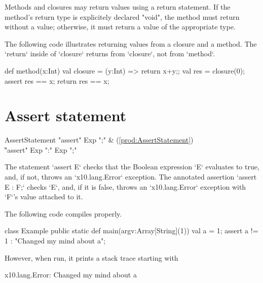 Methods and closures may return values using a return statement.
If the method's return type is explicitely declared \xcd"void",
the method must return without a value; otherwise, it must return
a value of the appropriate type.

\begin{ex}
The following code illustrates returning values from a closure and a method.
The \xcd`return` inside of \xcd`closure` returns from \xcd`closure`, not from
\xcd`method`.  
\begin{xten}
def method(x:Int) {
  val closure = (y:Int) => {return x+y;}; 
  val res = closure(0);
  assert res == x;
  return res == x;
}
\end{xten}


\end{ex}


\section{Assert statement} 

\begin{bbgrammar}
     AssertStatement \: \xcd"assert" Exp \xcd";" & (\ref{prod:AssertStatement}) \\
                    \| \xcd"assert" Exp  \xcd":" Exp  \xcd";" \\
\end{bbgrammar}

The statement \xcd`assert E` checks that the Boolean expression \xcd`E`
evaluates to true, and, if not, throws an \xcd`x10.lang.Error`  exception.  
The annotated assertion \xcd`assert E : F;` checks \xcd`E`, and, if it is
false, throws an \xcd`x10.lang.Error` exception with \xcd`F`'s value attached
to it. 

\begin{ex}
The following code compiles properly.  
% 
\begin{xten}
class Example {
  public static def main(argv:Array[String](1)) {
    val a = 1;
    assert a != 1 : "Changed my mind about a";
  }
}
\end{xten}
\noindent
However, when run, it 
prints a stack trace starting with 
\begin{xten}
x10.lang.Error: Changed my mind about a
\end{xten}
\end{ex}

